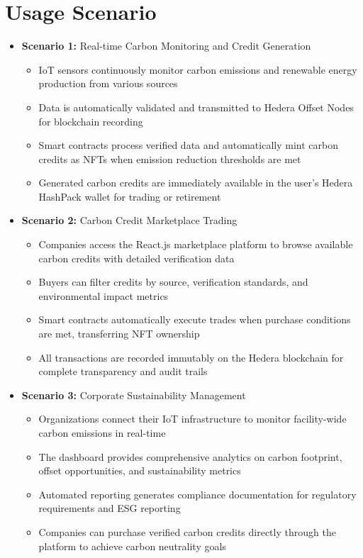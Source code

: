 \documentclass[oneside,a4paper,12pt]{book}
\begin{document}
\section{Usage Scenario}
\begin{itemize}
    \item \textbf{Scenario 1:} Real-time Carbon Monitoring and Credit Generation
    \begin{itemize}
        \item IoT sensors continuously monitor carbon emissions and renewable energy production from various sources
        \item Data is automatically validated and transmitted to Hedera Offset Nodes for blockchain recording
        \item Smart contracts process verified data and automatically mint carbon credits as NFTs when emission reduction thresholds are met
        \item Generated carbon credits are immediately available in the user's Hedera HashPack wallet for trading or retirement
    \end{itemize}

    \item \textbf{Scenario 2:} Carbon Credit Marketplace Trading
    \begin{itemize}
        \item Companies access the React.js marketplace platform to browse available carbon credits with detailed verification data
        \item Buyers can filter credits by source, verification standards, and environmental impact metrics
        \item Smart contracts automatically execute trades when purchase conditions are met, transferring NFT ownership
        \item All transactions are recorded immutably on the Hedera blockchain for complete transparency and audit trails
    \end{itemize}

    \item \textbf{Scenario 3:} Corporate Sustainability Management
    \begin{itemize}
        \item Organizations connect their IoT infrastructure to monitor facility-wide carbon emissions in real-time
        \item The dashboard provides comprehensive analytics on carbon footprint, offset opportunities, and sustainability metrics
        \item Automated reporting generates compliance documentation for regulatory requirements and ESG reporting
        \item Companies can purchase verified carbon credits directly through the platform to achieve carbon neutrality goals
    \end{itemize}
\end{itemize}
\end{document}
